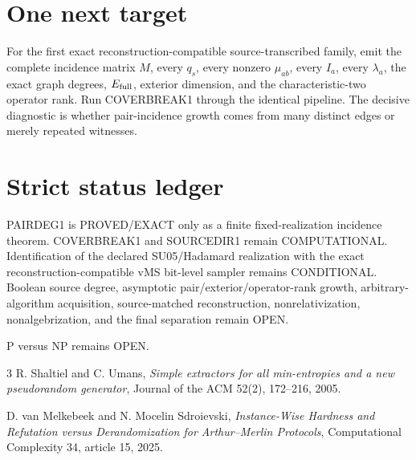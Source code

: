 \documentclass[11pt]{article}
\begin{document}
\section*{One next target}
For the first exact reconstruction-compatible source-transcribed family, emit the complete incidence matrix \(M\), every \(q_s\), every nonzero \(\mu_{ab}\), every \(I_a\), every \(\lambda_a\), the exact graph degrees, \(E_{\rm full}\), exterior dimension, and the characteristic-two operator rank. Run COVERBREAK1 through the identical pipeline. The decisive diagnostic is whether pair-incidence growth comes from many distinct edges or merely repeated witnesses.

\section*{Strict status ledger}
PAIRDEG1 is PROVED/EXACT only as a finite fixed-realization incidence theorem. COVERBREAK1 and SOURCEDIR1 remain COMPUTATIONAL. Identification of the declared SU05/Hadamard realization with the exact reconstruction-compatible vMS bit-level sampler remains CONDITIONAL. Boolean source degree, asymptotic pair/exterior/operator-rank growth, arbitrary-algorithm acquisition, source-matched reconstruction, nonrelativization, nonalgebrization, and the final separation remain OPEN.

P versus NP remains OPEN.

\begin{thebibliography}{3}
R. Shaltiel and C. Umans,
\emph{Simple extractors for all min-entropies and a new pseudorandom generator},
Journal of the ACM 52(2), 172--216, 2005.

D. van Melkebeek and N. Mocelin Sdroievski,
\emph{Instance-Wise Hardness and Refutation versus Derandomization for Arthur--Merlin Protocols},
Computational Complexity 34, article 15, 2025.
\end{thebibliography}
\end{document}
